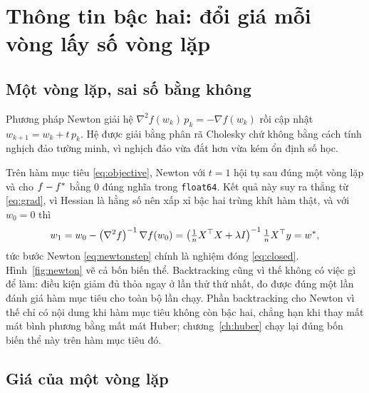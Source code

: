 \documentclass[12pt, a4paper, oneside]{report}
\theoremstyle{definition}
\begin{document}

\chapter{Thông tin bậc hai: đổi giá mỗi vòng lấy số vòng lặp}\label{ch:newton}

\section{Một vòng lặp, sai số bằng không}

Phương pháp Newton giải hệ $\nabla^{2} f(w_k)\, p_k = -\nabla f(w_k)$ rồi cập
nhật $w_{k+1} = w_k + t\, p_k$. Hệ được giải bằng phân rã Cholesky
\cite{nocedal2006numerical} chứ không bằng cách tính nghịch đảo tường minh, vì
nghịch đảo vừa đắt hơn vừa kém ổn định số học.

Trên hàm mục tiêu \eqref{eq:objective}, Newton với $t = 1$ hội tụ sau đúng một
vòng lặp và cho $f - f^{*}$ bằng $0$ đúng nghĩa trong \texttt{float64}. Kết quả
này suy ra thẳng từ \eqref{eq:grad}, vì Hessian là hằng số nên xấp xỉ bậc hai
trùng khít hàm thật, và với $w_{0} = 0$ thì
\begin{equation}\label{eq:newtonstep}
  w_{1} = w_{0} - \left( \nabla^{2} f \right)^{-1} \nabla f(w_{0})
        = \left( \tfrac{1}{n} X^{\top} X + \lambda I \right)^{-1} \tfrac{1}{n} X^{\top} y = w^{*},
\end{equation}
tức bước Newton \eqref{eq:newtonstep} chính là nghiệm đóng \eqref{eq:closed}.
Hình~\ref{fig:newton} vẽ cả bốn biến thể. Backtracking cũng vì thế
không có việc gì để làm: điều kiện giảm đủ thỏa ngay ở lần thử thứ nhất, đo được
đúng một lần đánh giá hàm mục tiêu cho toàn bộ lần chạy. Phần backtracking cho
Newton vì thế chỉ có nội dung khi hàm mục tiêu không còn bậc hai, chẳng
hạn khi thay mất mát bình phương bằng mất mát Huber; chương~\ref{ch:huber} chạy
lại đúng bốn biến thể này trên hàm mục tiêu đó.


\section{Giá của một vòng lặp}
\end{document}
